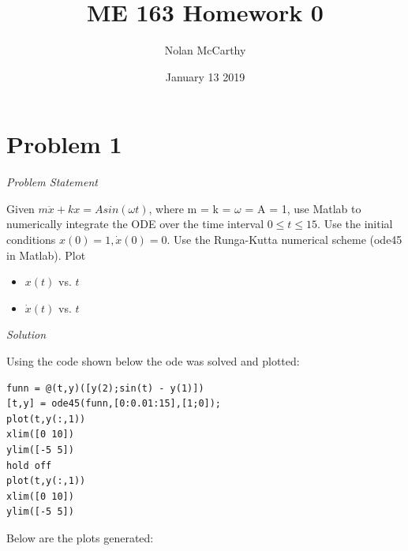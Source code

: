 \documentclass{article}
\title{ME 163 Homework 0}
\author{Nolan McCarthy }
\date{January 13 2019}
\begin{document}
\maketitle

\section{Problem 1}


\emph{Problem Statement}

Given
$m \ddot x + kx = A sin(\omega t)$,
where m = k = $\omega$ = A = 1, use Matlab to numerically integrate the ODE over the time interval
$0 \leq t \leq 15$. Use the initial conditions $x(0) = 1, \dot x (0) = 0$. Use the Runga-Kutta numerical scheme
(ode45 in Matlab). Plot
\begin{itemize}
\item $x(t)$ vs. $t$
\item $\dot x (t)$ vs. $t$
\end{itemize}
\emph{Solution}

Using the code shown below the ode was solved and plotted:
\begin{verbatim}
funn = @(t,y)([y(2);sin(t) - y(1)])
[t,y] = ode45(funn,[0:0.01:15],[1;0]);
plot(t,y(:,1))
xlim([0 10])
ylim([-5 5])
hold off
plot(t,y(:,1))
xlim([0 10])
ylim([-5 5])
\end{verbatim}


Below are the plots generated:
\end{document}
